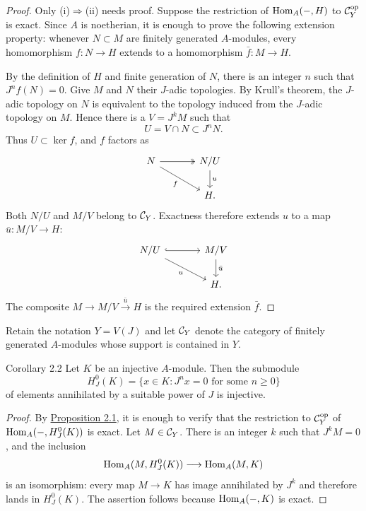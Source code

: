 \begin{proof}
Only (i)$\Rightarrow$(ii) needs proof. Suppose the restriction of
$\operatorname{Hom}_A(-,H)$ to $\mathcal C_Y^{\mathrm{op}}$ is exact. Since $A$ is
noetherian, it is enough to prove the following extension property: whenever
$N\subset M$ are finitely generated $A$-modules, every homomorphism
$f:N\to H$ extends to a homomorphism $\bar f:M\to H$.

By the definition of $H$ and finite generation of $N$, there is an integer
$n$ such that $J^n f(N)=0$. Give $M$ and $N$ their $J$-adic topologies. By
Krull's theorem, the $J$-adic topology on $N$ is equivalent to the topology
induced from the $J$-adic topology on $M$. Hence there is a
$V=J^kM$ such that
\[
  U=V\cap N\subset J^nN.
\]
Thus $U\subset\ker f$, and $f$ factors as
\[
\begin{tikzcd}[column sep=large]
N \arrow[r,two heads] \arrow[dr,"f"'] & N/U \arrow[d,"u"]\\
& H.
\end{tikzcd}
\]
Both $N/U$ and $M/V$ belong to $\mathcal C_Y$. Exactness therefore extends $u$
to a map $\bar u:M/V\to H$:
\[
\begin{tikzcd}[column sep=large]
N/U \arrow[r,hook] \arrow[dr,"u"'] & M/V \arrow[d,"\bar u"]\\
& H.
\end{tikzcd}
\]
The composite $M\to M/V\xrightarrow{\bar u}H$ is the required extension
$\bar f$.
\end{proof}


Retain the notation $Y=V(J)$ and let $\mathcal C_Y$ denote the category of
finitely generated $A$-modules whose support is contained in $Y$.

\begin{sgastatement}{Corollary 2.2}
Let $K$ be an injective $A$-module. Then the submodule
\[
  H^0_J(K)=\{x\in K: J^n x=0\text{ for some }n\geq 0\}
\]
of elements annihilated by a suitable power of $J$ is injective.
\end{sgastatement}

\begin{proof}
By \hyperref[IV.2.1]{Proposition 2.1}, it is enough to verify that the restriction to
$\mathcal C_Y^{\mathrm{op}}$ of
$\operatorname{Hom}_A(-,H^0_J(K))$ is exact. Let $M\in\mathcal C_Y$. There is an integer
$k$ such that $J^kM=0$, and the inclusion
\[
  \operatorname{Hom}_A(M,H^0_J(K))\longrightarrow \operatorname{Hom}_A(M,K)
\]
is an isomorphism: every map $M\to K$ has image annihilated by $J^k$ and
therefore lands in $H^0_J(K)$. The assertion follows because
$\operatorname{Hom}_A(-,K)$ is exact.
\end{proof}

